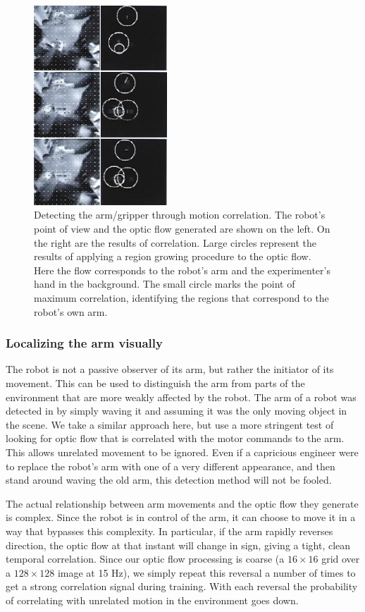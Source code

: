 \begin{figure}[tb]
\begin{center}
\includegraphics[width=5cm]{arm-detection2.eps}
\caption{ 
\label{fig:arm-detection}
%
Detecting the arm/gripper through motion correlation. The robot's
point of view and the optic flow generated are shown on the left. On
the right are the results of correlation.  Large circles represent the
results of applying a region growing procedure to the optic flow.
Here the flow corresponds to the robot's arm and the experimenter's
hand in the background. The small circle marks the point of maximum 
correlation, identifying the regions that correspond to the robot's own arm.
%
}
\end{center}
\end{figure}


\subsubsection*{Localizing the arm visually}

The robot is not a passive observer of its arm, but rather the
initiator of its movement.  This can be used to distinguish the arm
from parts of the environment that are more weakly affected by the
robot.  The arm of a robot was detected in \cite{Marjanovic-96-SAB} by
simply waving it and assuming it was the only moving object in the
scene.  We take a similar approach here, but use a more
stringent test of looking for optic flow that is correlated with
the motor commands to the arm.  This allows unrelated movement
to be ignored.  Even if a capricious engineer were to 
replace the robot's arm with one of a very different appearance,
and then stand around waving the old arm, this detection method
will not be fooled.  

The actual relationship between arm movements and the optic flow they
generate is complex.  Since the robot is in control of the arm, it can
choose to move it in a way that bypasses this complexity.  In
particular, if the arm rapidly reverses direction, the optic flow at
that instant will change in sign, giving a tight, clean temporal
correlation.  Since our optic flow processing is coarse (a $16\times
16$ grid over a $128\times 128$ image at 15 Hz), we simply repeat this
reversal a number of times to get a strong correlation signal during
training.  With each reversal the probability of correlating with
unrelated motion in the environment goes down.  


